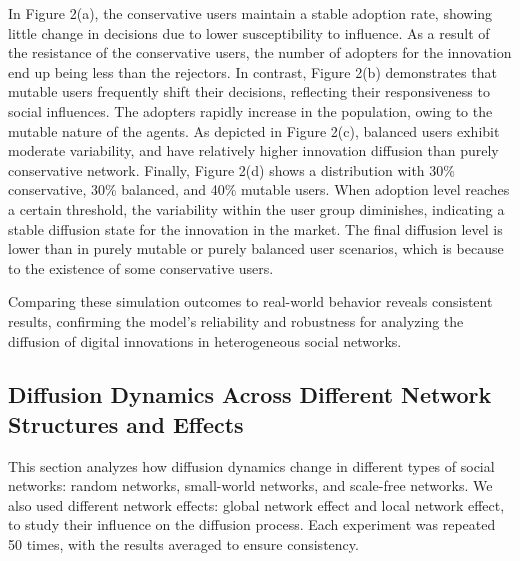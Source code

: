 \documentclass{article} %
\begin{document}
In Figure 2(a), the conservative users maintain a stable adoption rate, showing little change in decisions due to lower susceptibility to influence. As a result of the resistance of the conservative users, the number of adopters for the innovation end up being less than the rejectors. In contrast, Figure 2(b) demonstrates that mutable users frequently shift their decisions, reflecting their responsiveness to social influences. The adopters rapidly increase in the population, owing to the mutable nature of the agents. As depicted in Figure 2(c), balanced users exhibit moderate variability, and have relatively higher innovation diffusion than purely conservative network. Finally, Figure 2(d) shows a distribution with 30\% conservative, 30\% balanced, and 40\% mutable users. When adoption level reaches a certain threshold, the variability within the user group diminishes, indicating a stable diffusion state for the innovation in the market. The final diffusion level is lower than in purely mutable or purely balanced user scenarios, which is because to the existence of some conservative users.

Comparing these simulation outcomes to real-world behavior reveals consistent results, confirming the model's reliability and robustness for analyzing the diffusion of digital innovations in heterogeneous social networks.

\subsection{Diffusion Dynamics Across Different Network Structures and Effects}

This section analyzes how diffusion dynamics change in different types of social networks: random networks, small-world networks, and scale-free networks. We also used different network effects: global network effect and local network effect, to study their influence on the diffusion process. Each experiment was repeated 50 times, with the results averaged to ensure consistency.
\end{document}
